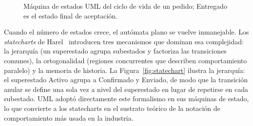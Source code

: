 \documentclass[11pt,a4paper,oneside]{report}
\begin{document}
	\begin{figure}[htbp]
		\centering
		\caption{M\'aquina de estados UML del ciclo de vida de un pedido; \textsf{Entregado} es el estado final de aceptaci\'on.}
		\label{fig:estados}
	\end{figure}
	
	Cuando el n\'umero de estados crece, el aut\'omata plano se vuelve inmanejable. Los \textit{statecharts} de Harel~\citep{harel_1987} introducen tres mecanismos que dominan esa complejidad: la jerarqu\'ia (un superestado agrupa subestados y factoriza las transiciones comunes), la ortogonalidad (regiones concurrentes que describen comportamiento paralelo) y la memoria de historia. La Figura~\ref{fig:statechart} ilustra la jerarqu\'ia: el superestado \textsf{Activo} agrupa a \textsf{Confirmado} y \textsf{Enviado}, de modo que la transici\'on \textsf{anular} se define una sola vez a nivel del superestado en lugar de repetirse en cada subestado. UML adopt\'o directamente este formalismo en sus m\'aquinas de estado, lo que convierte a los statecharts en el sustrato te\'orico de la notaci\'on de comportamiento m\'as usada en la industria.
	
\end{document}
